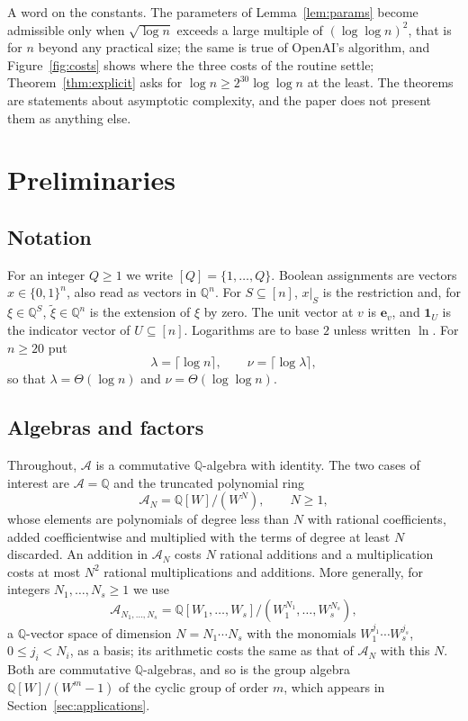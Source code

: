 \documentclass[11pt,reqno]{amsart}
\numberwithin{equation}{section}
\theoremstyle{plain}
\theoremstyle{definition}
\theoremstyle{remark}
\newcommand{\A}{\mathcal{A}}
\newcommand{\Q}{\mathbb{Q}}
\newcommand{\e}{\mathbf{e}}
\newcommand{\oai}{OpenAI}
\begin{document}
A word on the constants. The parameters of Lemma~\ref{lem:params} become
admissible only when $\sqrt{\log n}$ exceeds a large multiple of
$(\log\log n)^2$, that is for $n$ beyond any practical size; the same is true
of \oai{}'s algorithm, and Figure~\ref{fig:costs} shows where the three costs
of the routine settle; Theorem~\ref{thm:explicit} asks for
$\log n\ge2^{30}\log\log n$ at the least. The theorems are statements about asymptotic complexity,
and the paper does not present them as anything else.

\section{Preliminaries}\label{sec:prelim}

\subsection{Notation}
For an integer $Q\ge1$ we write $[Q]=\{1,\dots,Q\}$. Boolean assignments are
vectors $x\in\{0,1\}^n$, also read as vectors in $\Q^n$. For $S\subseteq[n]$,
$x|_S$ is the restriction and, for $\xi\in\Q^S$, $\tilde\xi\in\Q^n$ is the
extension of $\xi$ by zero. The unit vector at $v$ is $\e_v$, and $\mathbf 1_U$ is
the indicator vector of $U\subseteq[n]$. Logarithms are to base $2$ unless
written $\ln$. For $n\ge 20$ put
\begin{equation}\label{eq:lambda}
  \lambda=\lceil\log n\rceil,\qquad \nu=\lceil\log\lambda\rceil,
\end{equation}
so that $\lambda=\Theta(\log n)$ and $\nu=\Theta(\log\log n)$.

\subsection{Algebras and factors}
Throughout, $\A$ is a commutative $\Q$-algebra with identity. The two cases of
interest are $\A=\Q$ and the truncated polynomial ring
\begin{equation}\label{eq:AN}
  \A_N=\Q[W]/(W^{N}),\qquad N\ge1,
\end{equation}
whose elements are polynomials of degree less than $N$ with rational
coefficients, added coefficientwise and multiplied with the terms of degree at
least $N$ discarded. An addition in $\A_N$ costs $N$ rational additions and a
multiplication costs at most $N^2$ rational multiplications and additions. More
generally, for integers $N_1,\dots,N_s\ge1$ we use
\begin{equation}\label{eq:ANs}
  \A_{N_1,\dots,N_s}=\Q[W_1,\dots,W_s]/(W_1^{N_1},\dots,W_s^{N_s}),
\end{equation}
a $\Q$-vector space of dimension $N=N_1\cdots N_s$ with the monomials
$W_1^{j_1}\cdots W_s^{j_s}$, $0\le j_i<N_i$, as a basis; its arithmetic costs
the same as that of $\A_N$ with this $N$. Both are commutative $\Q$-algebras,
and so is the group algebra $\Q[W]/(W^{m}-1)$ of the cyclic group of order $m$,
which appears in Section~\ref{sec:applications}.
\end{document}
